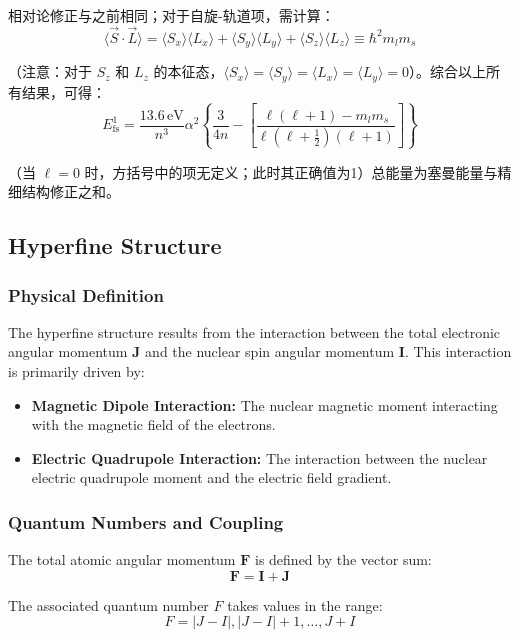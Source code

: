 相对论修正与之前相同；对于自旋-轨道项，需计算：
\begin{equation}
	\langle \vec{S} \cdot \vec{L} \rangle = \langle S_x \rangle \langle L_x \rangle + \langle S_y \rangle \langle L_y \rangle + \langle S_z \rangle \langle L_z \rangle \equiv \hbar^2 m_l m_s
\end{equation}

（注意：对于 \( S_z \) 和 \( L_z \) 的本征态，\( \langle S_x \rangle = \langle S_y \rangle = \langle L_x \rangle = \langle L_y \rangle = 0 \)）。综合以上所有结果，可得：
\begin{equation}
	E_{\text{fs}}^1 = \frac{13.6 \, \text{eV}}{n^3} \alpha^2 \left\{ \frac{3}{4n} - \left[ \frac{\ell(\ell+1) - m_l m_s}{\ell(\ell+\frac{1}{2})(\ell+1)} \right] \right\}
\end{equation}

（当 \( \ell=0 \) 时，方括号中的项无定义；此时其正确值为1）总能量为塞曼能量与精细结构修正之和。
\subsection{Hyperfine Structure}
\subsubsection{Physical Definition}
The hyperfine structure results from the interaction between the total electronic angular momentum $\mathbf{J}$ and the nuclear spin angular momentum $\mathbf{I}$. This interaction is primarily driven by:
\begin{itemize}
	\item \textbf{Magnetic Dipole Interaction:} The nuclear magnetic moment interacting with the magnetic field of the electrons.
	\item \textbf{Electric Quadrupole Interaction:} The interaction between the nuclear electric quadrupole moment and the electric field gradient.
\end{itemize}

\subsubsection{Quantum Numbers and Coupling}
The total atomic angular momentum $\mathbf{F}$ is defined by the vector sum:
\begin{equation}
	\mathbf{F} = \mathbf{I} + \mathbf{J}
\end{equation}

The associated quantum number $F$ takes values in the range:
\begin{equation}
	F = |J - I|, |J - I| + 1, \dots, J + I
\end{equation}

